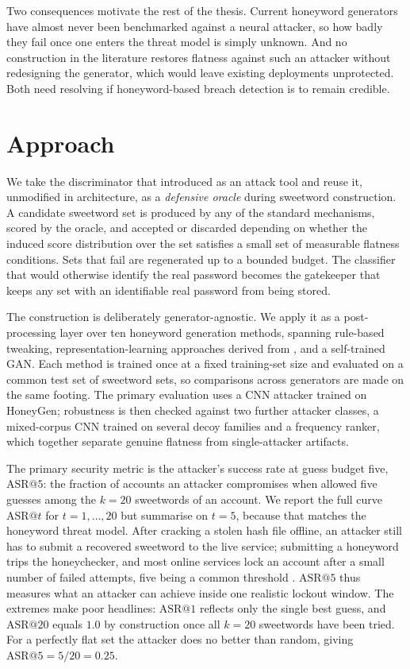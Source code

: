 Two consequences motivate the rest of the thesis. Current honeyword
generators have almost never been benchmarked against a neural attacker,
so how badly they fail once one enters the threat model is simply
unknown. And no construction in the literature restores flatness against
such an attacker without redesigning the generator, which would leave
existing deployments unprotected. Both need resolving if honeyword-based
breach detection is to remain credible.

\section{Approach}

We take the discriminator that \textcite{dani2024passfilter} introduced
as an attack tool and reuse it, unmodified in architecture, as a
\emph{defensive oracle} during sweetword construction. A candidate
sweetword set is produced by any of the standard mechanisms, scored by
the oracle, and accepted or discarded depending on whether the induced
score distribution over the set satisfies a small set of measurable
flatness conditions. Sets that fail are regenerated up to a bounded
budget. The classifier that would otherwise identify the real password
becomes the gatekeeper that keeps any set with an identifiable real
password from being stored.

The construction is deliberately generator-agnostic. We apply it as a
post-processing layer over ten honeyword generation methods, spanning
rule-based tweaking, representation-learning approaches derived from
\textcite{dionysiou2021honeygen}, and a self-trained GAN. Each method is
trained once at a fixed training-set size and evaluated on a common test
set of sweetword sets, so comparisons across generators are made on the
same footing. The primary evaluation uses a CNN attacker trained on
HoneyGen; robustness is then checked against two further attacker
classes, a mixed-corpus CNN trained on several decoy families and a
frequency ranker, which together separate genuine flatness from
single-attacker artifacts.

The primary security metric is the attacker's success rate at guess
budget five, $\mathrm{ASR}@5$: the fraction of accounts an attacker
compromises when allowed five guesses among the $k = 20$ sweetwords of
an account. We report the full curve $\mathrm{ASR}@t$ for
$t = 1, \dots, 20$ but summarise on $t = 5$, because that matches the
honeyword threat model. After cracking a stolen hash file offline, an
attacker still has to submit a recovered sweetword to the live service;
submitting a honeyword trips the honeychecker, and most online services
lock an account after a small number of failed attempts, five being a
common threshold \parencite{dani2024passfilter}. $\mathrm{ASR}@5$ thus
measures what an attacker can achieve inside one realistic lockout
window. The extremes make poor headlines: $\mathrm{ASR}@1$ reflects only
the single best guess, and $\mathrm{ASR}@{20}$ equals $1.0$ by
construction once all $k = 20$ sweetwords have been tried. For a
perfectly flat set the attacker does no better than random, giving
$\mathrm{ASR}@5 = 5/20 = 0.25$.

